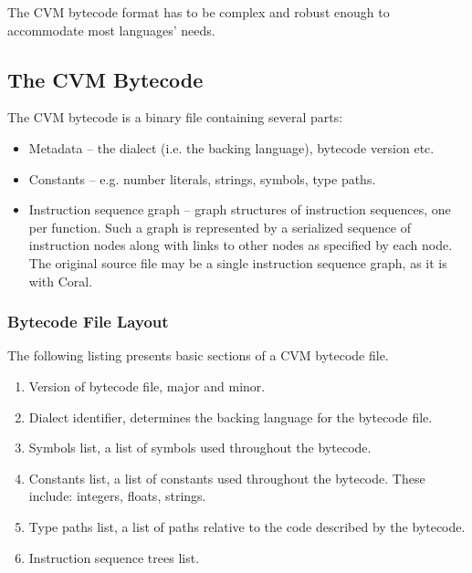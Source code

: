 The CVM bytecode format has to be complex and robust enough to accommodate most languages' needs. 





\subsection{The CVM Bytecode}

The CVM bytecode is a binary file containing several parts:

\begin{itemize}
\item Metadata -- the dialect (i.e. the backing language), bytecode version etc.
\item Constants -- e.g. number literals, strings, symbols, type paths. 
\item Instruction sequence graph -- graph structures of instruction sequences, one per function. Such a graph is represented by a serialized sequence of instruction nodes along with links to other nodes as specified by each node. The original source file may be a single instruction sequence graph, as it is with Coral. 
\end{itemize}







\subsubsection{Bytecode File Layout}

The following listing presents basic sections of a CVM bytecode file. 

\begin{enumerate}
\item Version of bytecode file, major and minor. 
\item Dialect identifier, determines the backing language for the bytecode file. 
\item Symbols list, a list of symbols used throughout the bytecode. 
\item Constants list, a list of constants used throughout the bytecode. These include: integers, floats, strings. 
\item Type paths list, a list of paths relative to the code described by the bytecode. 
\item Instruction sequence trees list. 
\end{enumerate}






